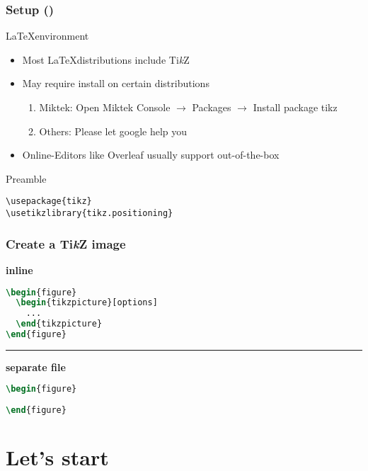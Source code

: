 \documentclass{beamer}
\newcommand{\tikzname}{Ti\textit{k}Z\xspace}
\begin{document}
\begin{frame}[fragile]
\frametitle{Setup ()}
\begin{block}{\LaTeX environment}
    \begin{itemize}
        \item Most \LaTeX distributions include \tikzname
        \item May require install on certain distributions
        \begin{enumerate}
            \item Miktek: Open Miktek Console \(\rightarrow\) Packages \(\rightarrow\) Install package tikz
            \item Others: Please let google help you
        \end{enumerate}
        \item Online-Editors like Overleaf usually support out-of-the-box
    \end{itemize}
\end{block}

\begin{block}{Preamble}
\begin{verbatim}
\usepackage{tikz}
\usetikzlibrary{tikz.positioning}
\end{verbatim}
\end{block}

\end{frame}


\begin{frame}[fragile]
\frametitle{Create a \tikzname image}
%
\textbf{inline}
\begin{lstlisting}[language=TeX]
\begin{figure}
  \begin{tikzpicture}[options]
    ...
  \end{tikzpicture}
\end{figure}
\end{lstlisting}
\hrule
\vspace{1em}
\textbf{separate file}
\begin{lstlisting}[language={TeX}]
\begin{figure}
  
\end{figure}
\end{lstlisting}
\end{frame}
%
\section{Let's start}
\end{document}
